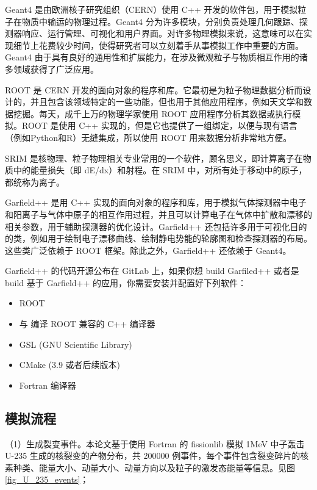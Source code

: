 \documentclass[AutoFakeBold]{LZUThesis}
\begin{document}
Geant4 是由欧洲核子研究组织（CERN）使用 C++ 开发的软件包，用于模拟粒子在物质中输运的物理过程。Geant4 分为许多模块，分别负责处理几何跟踪、探测器响应、运行管理、可视化和用户界面。对许多物理模拟来说，这意味可以在实现细节上花费较少时间，使得研究者可以立刻着手从事模拟工作中重要的方面。Geant4 由于具有良好的通用性和扩展能力，在涉及微观粒子与物质相互作用的诸多领域获得了广泛应用。

ROOT 是 CERN 开发的面向对象的程序和库。它最初是为粒子物理数据分析而设计的，并且包含该领域特定的一些功能，但也用于其他应用程序，例如天文学和数据挖掘。每天，成千上万的物理学家使用 ROOT 应用程序分析其数据或执行模拟。ROOT 是使用 C++ 实现的，但是它也提供了一组绑定，以便与现有语言（例如Python和R）无缝集成，所以使用 ROOT 用来数据分析非常地方便。

SRIM 是核物理、粒子物理相关专业常用的一个软件，顾名思义，即计算离子在物质中的能量损失（即 dE/dx）和射程。在 SRIM 中，对所有处于移动中的原子，都统称为离子。

Garfield++ 是用 C++ 实现的面向对象的程序和库，用于模拟气体探测器中电子和阳离子与气体中原子的相互作用过程，并且可以计算电子在气体中扩散和漂移的相关参数，用于辅助探测器的优化设计。Garfield++ 还包括许多用于可视化目的的类，例如用于绘制电子漂移曲线、绘制静电势能的轮廓图和检查探测器的布局。这些类广泛依赖于 ROOT 框架。除此之外，Garfield++ 还依赖于 Geant4。

Garfield++ 的代码开源公布在 GitLab 上，如果你想 build Garfiled++ 或者是 build 基于 Garfield++ 的应用，你需要安装并配置好下列软件\cite{schindler2019garfield}：

\begin{itemize}
    \item ROOT
    \item 与 编译 ROOT 兼容的 C++ 编译器
    \item GSL (GNU Scientific Library)
    \item CMake (3.9 或者后续版本)
    \item Fortran 编译器
\end{itemize}




\subsection{模拟流程}
（1）生成裂变事件。本论文基于使用 Fortran 的 fissionlib 模拟 1MeV 中子轰击 U-235 生成的核裂变的产物分布，共 200000 例事件，每个事件包含裂变碎片的核素种类、能量大小、动量大小、动量方向以及粒子的激发态能量等信息。见图 \ref{fig_U_235_events}；
\end{document}
